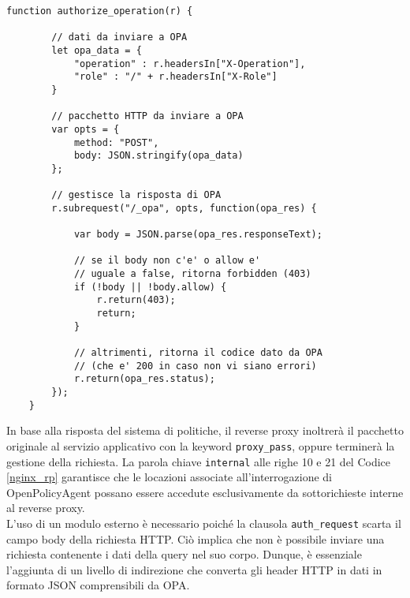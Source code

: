 \begin{lstlisting}[caption={[Frammento di codice del modulo NJS]Frammento di codice del modulo NJS dedicato all'estrazione dei dati e all'invio di questi al sistema delle politiche di accesso. In questo stesso codice viene inoltre gestita la ricezione della risposta e si valuta la decisione contenuta in essa. },captionpos=b,label=NJS]
    function authorize_operation(r) {

        // dati da inviare a OPA
        let opa_data = {
            "operation" : r.headersIn["X-Operation"],
            "role" : "/" + r.headersIn["X-Role"]
        }
    
        // pacchetto HTTP da inviare a OPA
        var opts = {
            method: "POST",
            body: JSON.stringify(opa_data)
        };
        
        // gestisce la risposta di OPA
        r.subrequest("/_opa", opts, function(opa_res) {
    
            var body = JSON.parse(opa_res.responseText);
            
            // se il body non c'e' o allow e' 
            // uguale a false, ritorna forbidden (403)
            if (!body || !body.allow) {
                r.return(403);
                return;
            }

            // altrimenti, ritorna il codice dato da OPA 
            // (che e' 200 in caso non vi siano errori)
            r.return(opa_res.status);
        });
    }
\end{lstlisting}
In base alla risposta del sistema di politiche, il reverse proxy inoltrerà il pacchetto originale al servizio applicativo con la keyword \texttt{proxy\_pass}, 
oppure terminerà la gestione della richiesta.
La parola chiave \texttt{internal} alle righe 10 e 21 del Codice \ref{nginx_rp} garantisce che le locazioni 
associate all'interrogazione di OpenPolicyAgent possano essere accedute esclusivamente da sottorichieste interne al reverse proxy. 
\\ L'uso di un modulo esterno è necessario poiché la clausola \texttt{auth\_request} scarta il campo body della 
richiesta HTTP. Ciò implica che non è possibile inviare una richiesta contenente i dati della query nel suo corpo.
Dunque, è essenziale l'aggiunta di un livello di indirezione che converta gli header HTTP in dati in formato
JSON comprensibili da OPA. 


